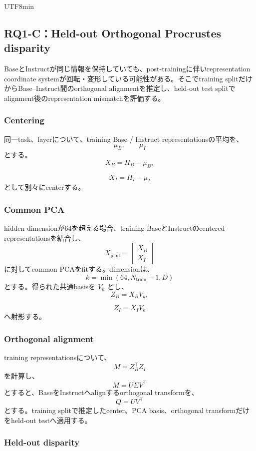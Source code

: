 \documentclass{article} %
\begin{document}
\begin{CJK*}{UTF8}{min}
\subsection{RQ1-C：Held-out Orthogonal Procrustes disparity}

BaseとInstructが同じ情報を保持していても、post-trainingに伴いrepresentation coordinate systemが回転・変形している可能性がある。そこでtraining splitだけからBase--Instruct間のorthogonal alignmentを推定し、held-out test splitでalignment後のrepresentation mismatchを評価する。


\subsubsection{Centering}

同一task、layerについて、training Base / Instruct representationsの平均を、
\[
\mu_B,
\qquad
\mu_I
\]
とする。
\[
X_B
=
H_B-\mu_B,
\]

\[
X_I
=
H_I-\mu_I
\]
として別々にcenterする。


\subsubsection{Common PCA}

hidden dimensionが64を超える場合、training BaseとInstructのcentered representationsを結合し、
\[
X_{\mathrm{joint}}
=
\begin{bmatrix}
X_B\\
X_I
\end{bmatrix}
\]
に対してcommon PCAをfitする。dimensionは、
\[
k
=
\min
(
64,
N_{\mathrm{train}}-1,
D
)
\]
とする。得られた共通basisを \(V_k\) とし、
\[
Z_B
=
X_BV_k,
\]

\[
Z_I
=
X_IV_k
\]
へ射影する。


\subsubsection{Orthogonal alignment}

training representationsについて、
\[
M
=
Z_B^\top Z_I
\]
を計算し、
\[
M
=
U\Sigma V^\top
\]
とすると、BaseをInstructへalignするorthogonal transformを、
\[
Q
=
UV^\top
\]
とする。training splitで推定したcenter、PCA basis、orthogonal transformだけをheld-out testへ適用する。


\subsubsection{Held-out disparity}


\end{CJK*}
\end{document}
